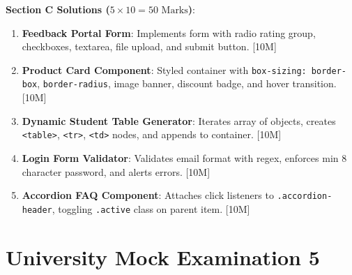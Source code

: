 \begin{solutionbox}
\medskip
\noindent\textbf{Section C Solutions ($5 \times 10 = 50\text{ Marks}$)}:
\begin{enumerate}[start=17]
    \item \textbf{Feedback Portal Form}: Implements form with radio rating group, checkboxes, textarea, file upload, and submit button. [10M]
    \item \textbf{Product Card Component}: Styled container with \texttt{box-sizing: border-box}, \texttt{border-radius}, image banner, discount badge, and hover transition. [10M]
    \item \textbf{Dynamic Student Table Generator}: Iterates array of objects, creates \texttt{<table>}, \texttt{<tr>}, \texttt{<td>} nodes, and appends to container. [10M]
    \item \textbf{Login Form Validator}: Validates email format with regex, enforces min 8 character password, and alerts errors. [10M]
    \item \textbf{Accordion FAQ Component}: Attaches click listeners to \texttt{.accordion-header}, toggling \texttt{.active} class on parent item. [10M]
\end{enumerate}
\end{solutionbox}

\section{University Mock Examination 5}

